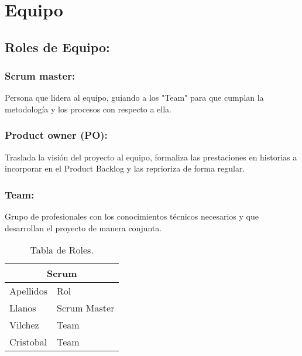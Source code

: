 \chapter{Equipo}
\vspace{-0.60cm}
\section{Roles de Equipo:}
\subsection{Scrum master:}

 Persona que lidera al equipo, guiando a los "Team" para que cumplan la metodología y los procesos con respecto a ella.
 
 
\subsection{Product owner (PO):}

 Traslada la visión del proyecto al equipo, formaliza las prestaciones en historias a incorporar en el Product Backlog y las reprioriza de forma regular.
  
\subsection{Team:}
Grupo de profesionales con los conocimientos técnicos necesarios y que desarrollan el proyecto de manera conjunta.

\begin{table}[htbp]
	\begin{center}
		\begin{tabular}{|l|l|}
			\hline
			\multicolumn{2}{|c|}{Scrum} \\ \hline
			Apellidos & Rol \\
			\hline \hline
			Llanos & Scrum Master \\ \hline
			Vilchez & Team \\ \hline
			Cristobal & Team \\ \hline
		\end{tabular}
		\caption{Tabla de Roles.}
		\label{tabla:Roles}
	\end{center}
\end{table}